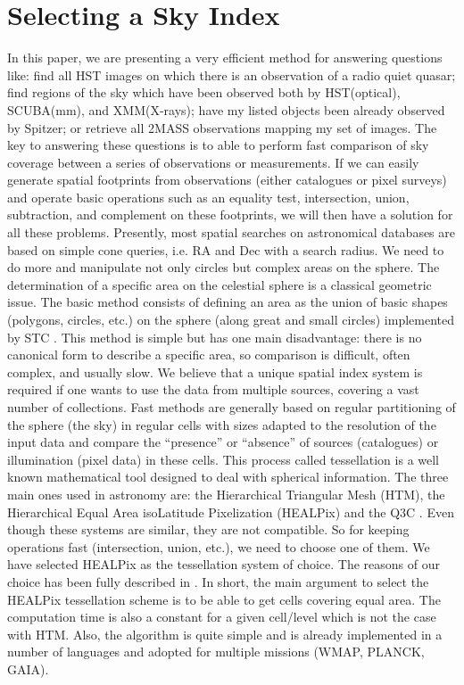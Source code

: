\section{Selecting a Sky Index}
In this paper, we are presenting a very efficient method for answering questions like: find all HST images on which there is an observation of a radio quiet quasar; find regions of the sky which have been observed both by HST(optical), SCUBA(mm), and XMM(X-rays); have my listed objects been already observed by Spitzer; or retrieve all 2MASS observations mapping my set of images. 
The key to answering these questions is to able to perform fast comparison of sky coverage between a series of observations or measurements. If we can easily generate spatial footprints from observations (either catalogues or pixel surveys) and operate basic operations such as an equality test, intersection, union, subtraction, and complement on these footprints, we will then have a solution for all these problems. Presently, most spatial searches on astronomical databases are based on simple
cone queries, i.e. RA and Dec with a search radius. We need to do more and manipulate not only circles but complex areas on the sphere.
The determination of a specific area on the celestial sphere is a classical geometric issue.
The basic method consists of defining an area as the union of basic shapes
(polygons, circles, etc.) on the sphere (along great and small circles) implemented by STC \citep{STC}. This method is simple but has one main disadvantage: there is no canonical form to describe a specific area, so comparison is difficult, often complex, and usually slow. We believe that a unique spatial index system is required if one wants to use the data from multiple sources, covering a vast number of collections. Fast methods are generally based on regular partitioning of the sphere (the sky) in regular cells with sizes adapted to the resolution of the input data and compare the ``presence'' or ``absence'' of sources (catalogues) or illumination (pixel data) in these cells.
This process called tessellation is a well known mathematical tool designed to deal with spherical information.
The three main ones used in astronomy are: the Hierarchical Triangular Mesh \cite{HTM} (HTM),
the Hierarchical Equal Area isoLatitude Pixelization \citep{Healpix} (HEALPix) and the Q3C \citep{quadtreee}. Even though these systems are similar, they are not compatible. So for keeping operations fast (intersection, union, etc.), we need to choose one of them. We have selected HEALPix as the tessellation system of choice. The reasons of our choice has been fully described in  \citep{Fernique}. In short, the main argument to select the HEALPix tessellation scheme is to be able to get cells covering equal area. The computation time is also a constant for a given cell/level which is not the case with HTM. Also, the algorithm is quite simple and is already implemented in a number of languages and adopted for multiple missions  (WMAP, PLANCK, GAIA).


